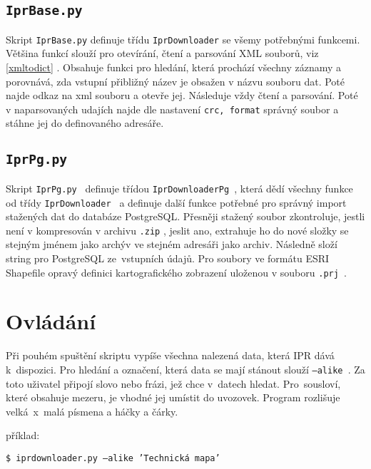 \subsection{{\tt IprBase.py}}
Skript {\tt IprBase.py} definuje třídu {\tt IprDownloader} se všemy 
potřebnými funkcemi. Většina funkcí slouží pro otevírání, čtení a parsování
XML souborů, viz \ref{xmltodict} .
Obsahuje funkci pro hledání, která prochází všechny záznamy a 
porovnává, zda vstupní přibližný název je obsažen v názvu souboru dat. Poté 
najde odkaz na xml souboru a otevře jej. Následuje vždy čtení a parsování. 
Poté v naparsovaných udajích najde dle nastavení {\tt crc, format} správný soubor 
a stáhne jej do definovaného adresáře.


\subsection{{\tt IprPg.py}}
Skript {\tt IprPg.py } definuje třídou {\tt IprDownloaderPg }, která dědí 
všechny funkce od třídy {\tt IprDownloader } a definuje další funkce potřebné pro 
správný import stažených dat do databáze PostgreSQL. 
Přesněji stažený soubor zkontroluje, jestli není v kompresován v archivu 
{\tt *.zip} , jeslit ano, extrahuje ho do nové složky se stejným jménem jako
archýv ve stejném adresáři jako archiv. Následně složí string pro PostgreSQL 
ze~vstupních údajů. Pro soubory ve formátu ESRI Shapefile opravý definici 
kartografického zobrazení uloženou v souboru {\tt *.prj }. 


\section{Ovládání}
Při pouhém spuštění skriptu vypíše všechna nalezená data, která IPR dává 
k~dispozici. Pro hledání a označení, která data se mají stánout slouží 
{\tt ---alike }. Za toto uživatel připojí slovo nebo frázi, jež chce v~datech
hledat. Pro~sousloví, které obsahuje mezeru, je vhodné jej umístit do uvozovek. 
Program rozlišuje velká~x~malá písmena a háčky a čárky.

příklad:

{\tt \$ iprdownloader.py ---alike 'Technická mapa'}
  

